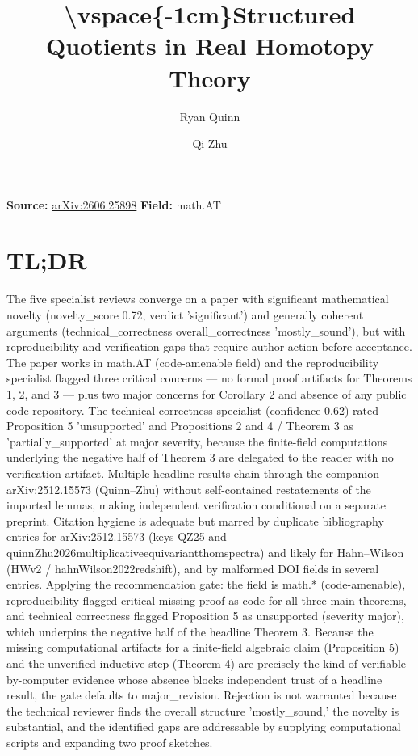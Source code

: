 \documentclass[11pt]{article}
\title{\textbackslash{}vspace\{-1cm\}Structured Quotients in Real Homotopy Theory}
\author{Ryan Quinn \and Qi Zhu}
\date{}
\begin{document}
\maketitle

\noindent\textbf{Source:} \href{https://arxiv.org/abs/2606.25898}{arXiv:2606.25898} \quad \textbf{Field:} math.AT\\

\section*{TL;DR}
The five specialist reviews converge on a paper with significant mathematical novelty (novelty\_score 0.72, verdict 'significant') and generally coherent arguments (technical\_correctness overall\_correctness 'mostly\_sound'), but with reproducibility and verification gaps that require author action before acceptance. The paper works in math.AT (code-amenable field) and the reproducibility specialist flagged three critical concerns --- no formal proof artifacts for Theorems 1, 2, and 3 --- plus two major concerns for Corollary 2 and absence of any public code repository. The technical correctness specialist (confidence 0.62) rated Proposition 5 'unsupported' and Propositions 2 and 4 / Theorem 3 as 'partially\_supported' at major severity, because the finite-field computations underlying the negative half of Theorem 3 are delegated to the reader with no verification artifact. Multiple headline results chain through the companion arXiv:2512.15573 (Quinn--Zhu) without self-contained restatements of the imported lemmas, making independent verification conditional on a separate preprint. Citation hygiene is adequate but marred by duplicate bibliography entries for arXiv:2512.15573 (keys QZ25 and quinnZhu2026multiplicativeequivariantthomspectra) and likely for Hahn--Wilson (HWv2 / hahnWilson2022redshift), and by malformed DOI fields in several entries. Applying the recommendation gate: the field is math.* (code-amenable), reproducibility flagged critical missing proof-as-code for all three main theorems, and technical correctness flagged Proposition 5 as unsupported (severity major), which underpins the negative half of the headline Theorem 3. Because the missing computational artifacts for a finite-field algebraic claim (Proposition 5) and the unverified inductive step (Theorem 4) are precisely the kind of verifiable-by-computer evidence whose absence blocks independent trust of a headline result, the gate defaults to major\_revision. Rejection is not warranted because the technical reviewer finds the overall structure 'mostly\_sound,' the novelty is substantial, and the identified gaps are addressable by supplying computational scripts and expanding two proof sketches.
\end{document}
